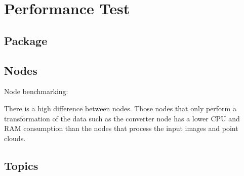 \section{Performance Test}

	\subsection{Package}

	\subsection{Nodes}

Node benchmarking: 

			There is a high difference between nodes. Those nodes that only perform a transformation of the data such as the converter node has a lower CPU and RAM consumption than the nodes that process the input images and point clouds. 

	\subsection{Topics}

	